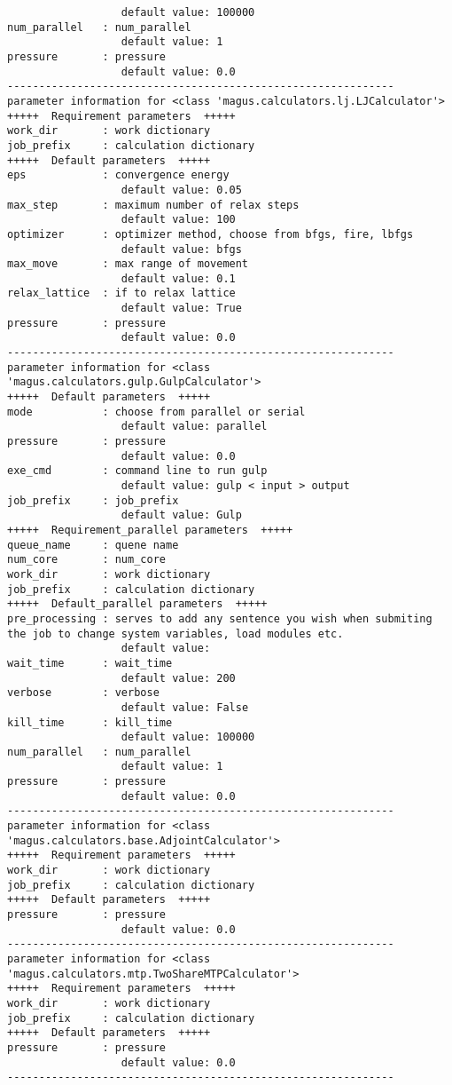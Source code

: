 \documentclass[12pt,oneside]{book}
\begin{document}
\begin{tcolorbox}
\begin{verbatim}
                  default value: 100000
num_parallel   : num_parallel
                  default value: 1
pressure       : pressure
                  default value: 0.0
-------------------------------------------------------------
parameter information for <class 'magus.calculators.lj.LJCalculator'>
+++++  Requirement parameters  +++++
work_dir       : work dictionary
job_prefix     : calculation dictionary
+++++  Default parameters  +++++
eps            : convergence energy
                  default value: 0.05
max_step       : maximum number of relax steps
                  default value: 100
optimizer      : optimizer method, choose from bfgs, fire, lbfgs
                  default value: bfgs
max_move       : max range of movement
                  default value: 0.1
relax_lattice  : if to relax lattice
                  default value: True
pressure       : pressure
                  default value: 0.0
-------------------------------------------------------------
parameter information for <class 'magus.calculators.gulp.GulpCalculator'>
+++++  Default parameters  +++++
mode           : choose from parallel or serial
                  default value: parallel
pressure       : pressure
                  default value: 0.0
exe_cmd        : command line to run gulp
                  default value: gulp < input > output
job_prefix     : job_prefix
                  default value: Gulp
+++++  Requirement_parallel parameters  +++++
queue_name     : quene name
num_core       : num_core
work_dir       : work dictionary
job_prefix     : calculation dictionary
+++++  Default_parallel parameters  +++++
pre_processing : serves to add any sentence you wish when submiting the job to change system variables, load modules etc.
                  default value: 
wait_time      : wait_time
                  default value: 200
verbose        : verbose
                  default value: False
kill_time      : kill_time
                  default value: 100000
num_parallel   : num_parallel
                  default value: 1
pressure       : pressure
                  default value: 0.0
-------------------------------------------------------------
parameter information for <class 'magus.calculators.base.AdjointCalculator'>
+++++  Requirement parameters  +++++
work_dir       : work dictionary
job_prefix     : calculation dictionary
+++++  Default parameters  +++++
pressure       : pressure
                  default value: 0.0
-------------------------------------------------------------
parameter information for <class 'magus.calculators.mtp.TwoShareMTPCalculator'>
+++++  Requirement parameters  +++++
work_dir       : work dictionary
job_prefix     : calculation dictionary
+++++  Default parameters  +++++
pressure       : pressure
                  default value: 0.0
-------------------------------------------------------------
    \end{verbatim}
\end{tcolorbox}
\end{document}
